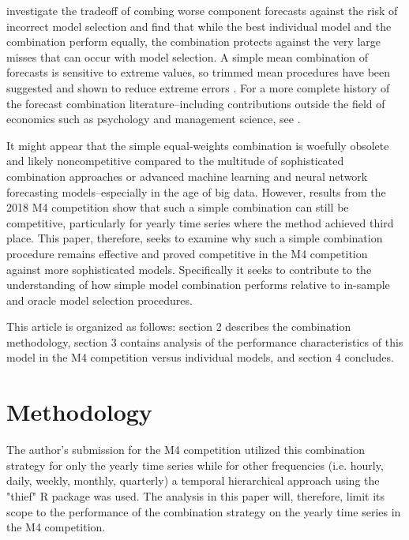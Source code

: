 \documentclass[11pt,3p,review,authoryear]{elsarticle}
\begin{document}
\cite{HIBON2005} investigate the tradeoff of combing worse component forecasts against the risk of incorrect model selection and find that while the best individual model and the combination perform equally, the combination protects against the very large misses that can occur with model selection. A simple mean combination of forecasts is sensitive to extreme values, so trimmed mean procedures have been suggested and shown to reduce extreme errors \citep{JOSE2008}. For a more complete history of the forecast combination literature--including contributions outside the field of economics such as psychology and management science, see \cite{CLEMEN1988}.

It might appear that the simple equal-weights combination is woefully obsolete and likely noncompetitive compared to the multitude of sophisticated combination approaches or advanced machine learning and neural network forecasting models--especially in the age of big data. However, results from the 2018 M4 competition \citep{M4} show that such a simple combination can still be competitive, particularly for yearly time series where the method achieved third place. This paper, therefore, seeks to examine why such a simple combination procedure remains effective and proved competitive in the M4 competition against more sophisticated models. Specifically it seeks to contribute to the understanding of how simple model combination performs relative to in-sample and oracle model selection procedures.


This article is organized as follows: section 2 describes the combination methodology, section 3 contains analysis of the performance characteristics of this model in the M4 competition versus individual models, and section 4 concludes.


\section{Methodology}
The author's submission for the M4 competition utilized this combination strategy for only the yearly time series while for other frequencies (i.e. hourly, daily, weekly, monthly, quarterly) a temporal hierarchical approach using the "thief" R package \citep{ATHANASOPOULOS201760} was used. The analysis in this paper will, therefore, limit its scope to the performance of the combination strategy on the yearly time series in the M4 competition.
\end{document}
